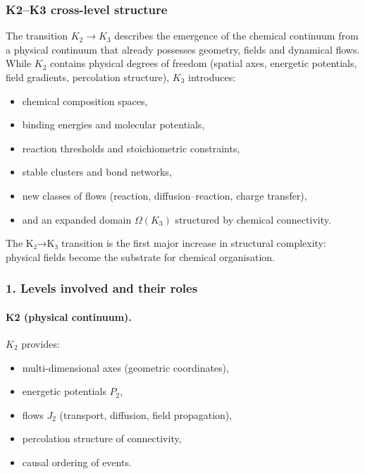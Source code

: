 
\subsubsection{K2–K3 cross-level structure}
\label{sec:crossk-k2-k3}

The transition $K_2 \rightarrow K_3$ describes the emergence of the chemical
continuum from a physical continuum that already possesses geometry, fields
and dynamical flows. While $K_2$ contains physical degrees of freedom
(spatial axes, energetic potentials, field gradients, percolation structure),
$K_3$ introduces:
\begin{itemize}
  \item chemical composition spaces,
  \item binding energies and molecular potentials,
  \item reaction thresholds and stoichiometric constraints,
  \item stable clusters and bond networks,
  \item new classes of flows (reaction, diffusion–reaction, charge transfer),
  \item and an expanded domain $\Omega(K_3)$ structured by chemical
        connectivity.
\end{itemize}

The K₂→K₃ transition is the first major increase in structural complexity:
physical fields become the substrate for chemical organisation.

\subsubsection{1. Levels involved and their roles}

\paragraph{K2 (physical continuum).}
$K_2$ provides:
\begin{itemize}
  \item multi-dimensional axes (geometric coordinates),
  \item energetic potentials $P_2$,
  \item flows $J_2$ (transport, diffusion, field propagation),
  \item percolation structure of connectivity,
  \item causal ordering of events.
\end{itemize}

